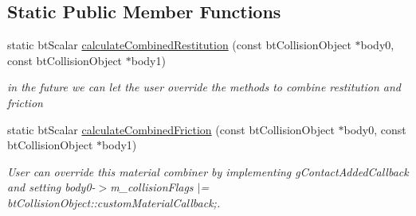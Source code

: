 \subsection*{Static Public Member Functions}
\begin{DoxyCompactItemize}
\item 
\hypertarget{classbt_manifold_result_aa4419fc3b0d13ccc2cbfd7739b047c04}{static bt\+Scalar \hyperlink{classbt_manifold_result_aa4419fc3b0d13ccc2cbfd7739b047c04}{calculate\+Combined\+Restitution} (const bt\+Collision\+Object $\ast$body0, const bt\+Collision\+Object $\ast$body1)}\label{classbt_manifold_result_aa4419fc3b0d13ccc2cbfd7739b047c04}

\begin{DoxyCompactList}\small\item\em in the future we can let the user override the methods to combine restitution and friction \end{DoxyCompactList}\item 
\hypertarget{classbt_manifold_result_a162717dce3ef3a756ae55ec04a179ed5}{static bt\+Scalar \hyperlink{classbt_manifold_result_a162717dce3ef3a756ae55ec04a179ed5}{calculate\+Combined\+Friction} (const bt\+Collision\+Object $\ast$body0, const bt\+Collision\+Object $\ast$body1)}\label{classbt_manifold_result_a162717dce3ef3a756ae55ec04a179ed5}

\begin{DoxyCompactList}\small\item\em User can override this material combiner by implementing g\+Contact\+Added\+Callback and setting body0-\/$>$m\+\_\+collision\+Flags $\vert$= bt\+Collision\+Object\+::custom\+Material\+Callback;. \end{DoxyCompactList}\end{DoxyCompactItemize}
